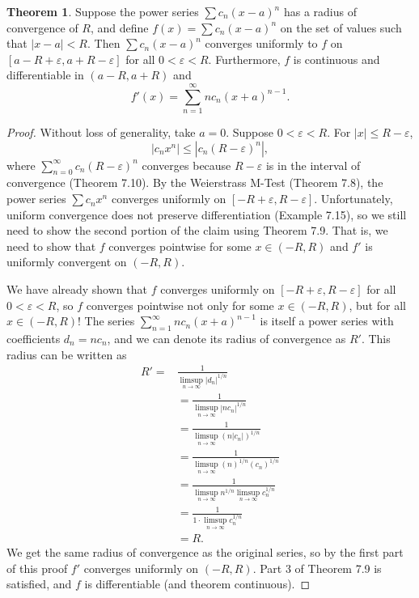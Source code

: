 \documentclass{article}
\theoremstyle{definition}
\newtheorem{theorem}{Theorem}[section]
\begin{document}
\begin{theorem}
	Suppose the power series $ \sum c_n(x-a)^n $ has a radius of convergence of $ R $, and define $ f(x)=\sum c_n(x-a)^n $ on the set of values such that $ |x-a|<R $. Then $ \sum c_n(x-a)^n $ converges uniformly to $ f $ on $ [a-R +\varepsilon,a+R-\varepsilon] $ for all $ 0<\varepsilon < R $. Furthermore, $ f $ is continuous and differentiable in $ (a-R,a+R) $ and $$f'(x)=\sum_{n=1}^{\infty}nc_n(x+a)^{n-1} .$$ 
\end{theorem}
\begin{proof}
	Without loss of generality, take $ a = 0 $. Suppose $ 0<\varepsilon < R$. For $ |x|\le R-\varepsilon $, $$|c_nx^n|\le |c_n(R-\varepsilon)^n|,$$ where $ \sum_{n=0}^{\infty} c_n(R-\varepsilon)^n $ converges because $ R- \varepsilon $ is in the interval of convergence (Theorem 7.10). By the Weierstrass M-Test (Theorem 7.8), the power series $ \sum c_nx^n $ converges uniformly on $ [-R+\varepsilon, R-\varepsilon] $. Unfortunately, uniform convergence does not preserve differentiation (Example 7.15), so we still need to show the second portion of the claim using Theorem 7.9. That is, we need to show that $ f $ converges pointwise for some $ x\in(-R,R)  $  and $ f' $ is uniformly convergent on $ (-R,R) $. 
	
	We have already shown that $ f $ converges uniformly on $ [-R+\varepsilon, R-\varepsilon] $ for all $ 0<\varepsilon<R $, so $ f $ converges pointwise not only for some $ x\in(-R,R) $, but for all $ x\in(-R,R) $! The series $ \sum_{n=1}^{\infty}nc_n(x+a)^{n-1} $ is itself a power series with coefficients $ d_n = nc_n $, and we can denote its radius of convergence as $ R' $. This radius can be written as
	\begin{align*}
		R' = & \frac{1}{\limsup\limits_{n\to\infty}|d_n|^{1/n}}\\ &=\frac{1}{\limsup\limits_{n\to\infty}|nc_n|^{1/n}}\\&=\frac{1}{\limsup\limits_{n\to\infty}(n|c_n|)^{1/n}}\\&=\frac{1}{\limsup\limits_{n\to\infty}(n)^{1/n}(c_n)^{1/n}}\\&= \frac{1}{\limsup\limits_{n\to\infty}n^{1/n}\limsup\limits_{n\to\infty}c_n^{1/n}}\\&= \frac{1}{1\cdot \limsup\limits_{n\to\infty}c_n^{1/n}}\\ & = R.
	\end{align*}
	We get the same radius of convergence as the original series, so by the first part of this proof $ f' $ converges uniformly on $ (-R,R) $. Part 3 of Theorem 7.9 is satisfied, and $ f $ is differentiable (and theorem continuous). 
\end{proof}
\end{document}
